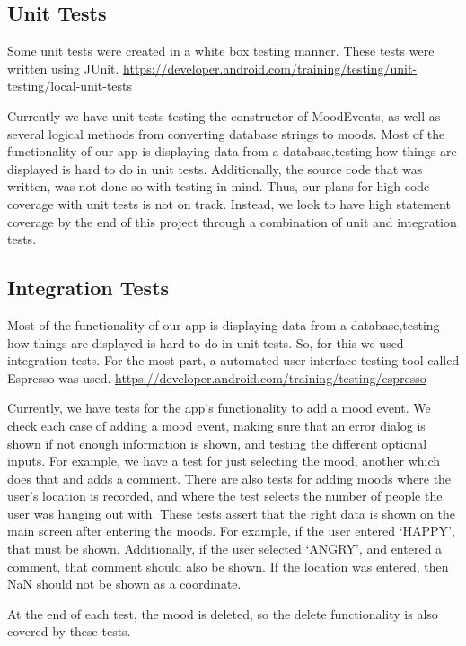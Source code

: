 \subsection{Unit Tests}
Some unit tests were created in a white box testing manner.
These tests were written using JUnit.
\url{https://developer.android.com/training/testing/unit-testing/local-unit-tests}

Currently we have unit tests testing the constructor of MoodEvents, as well as several logical methods from converting database strings to moods. Most of the functionality of our app is displaying data from a database,testing how things are displayed is hard to do in unit tests. Additionally, the source code that was written, was not done so with testing in mind. Thus, our plans for high code coverage with unit tests is not on track. Instead, we look to have high statement coverage by the end of this project through a combination of unit and integration tests. 


\subsection{Integration Tests}

Most of the functionality of our app is displaying data from a database,testing how things are displayed is hard to do in unit tests.
So, for this we used integration tests. For the most part, a automated user interface testing
tool called Espresso was used.
\url{https://developer.android.com/training/testing/espresso}

Currently, we have tests for the app's functionality to add a mood event.
We check each case of adding a mood event, making sure that an error
dialog is shown if not enough information is shown, and testing the
different optional inputs. For example, we have a test for just selecting
the mood, another which does that and adds a comment. There are also tests
for adding moods where the user's location is recorded, and where the test
selects the number of people the user was hanging out with.
These tests assert that the right data is shown on the main screen
after entering the moods. For example, if the user entered `HAPPY', that
must be shown. Additionally, if the user selected `ANGRY', and entered
a comment, that comment should also be shown. If the location was entered,
then NaN should not be shown as a coordinate.

At the end of each test, the mood is deleted, so the delete functionality
is also covered by these tests.

